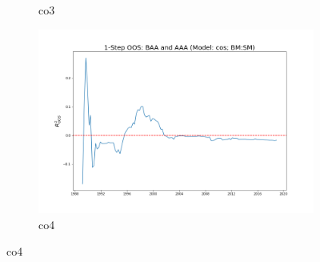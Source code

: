 \documentclass[a4paper,12pt,times,numbered,print,index]{report}
\numberwithin{equation}{section}
\begin{document}
\begin{figure}[!htbp]
\begin{subfigure}[b]{0.42\linewidth}
		\caption{co3}
	\end{subfigure}
	\begin{subfigure}[b]{0.42\linewidth}
		\includegraphics[width=0.9\linewidth]{OOS_plots/cos_co4_SM.png}
		\caption{co4}
	\end{subfigure}
	\label{g2}
\end{figure}
\end{document}
